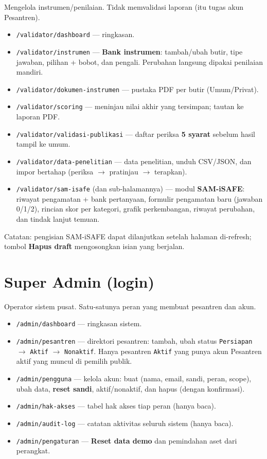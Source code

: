 \documentclass[11pt,a4paper]{article}
\newcommand{\code}[1]{\texttt{#1}}
\begin{document}
Mengelola instrumen/penilaian. Tidak memvalidasi laporan (itu tugas akun Pesantren).
\begin{itemize}
  \item \code{/validator/dashboard} --- ringkasan.
  \item \code{/validator/instrumen} --- \textbf{Bank instrumen}: tambah/ubah butir,
        tipe jawaban, pilihan + bobot, dan pengali. Perubahan langsung dipakai
        penilaian mandiri.
  \item \code{/validator/dokumen-instrumen} --- pustaka PDF per butir (Umum/Privat).
  \item \code{/validator/scoring} --- meninjau nilai akhir yang tersimpan; tautan
        ke laporan PDF.
  \item \code{/validator/validasi-publikasi} --- daftar periksa \textbf{5 syarat}
        sebelum hasil tampil ke umum.
  \item \code{/validator/data-penelitian} --- data penelitian, unduh CSV/JSON, dan
        impor bertahap (periksa $\rightarrow$ pratinjau $\rightarrow$ terapkan).
  \item \code{/validator/sam-isafe} (dan sub-halamannya) --- modul \textbf{SAM-iSAFE}:
        riwayat pengamatan + bank pertanyaan, formulir pengamatan baru (jawaban
        0/1/2), rincian skor per kategori, grafik perkembangan, riwayat perubahan,
        dan tindak lanjut temuan.
\end{itemize}

\noindent Catatan: pengisian SAM-iSAFE dapat dilanjutkan setelah halaman
di-refresh; tombol \textbf{Hapus draft} mengosongkan isian yang berjalan.

\section{Super Admin (login)}

Operator sistem pusat. Satu-satunya peran yang membuat pesantren dan akun.
\begin{itemize}
  \item \code{/admin/dashboard} --- ringkasan sistem.
  \item \code{/admin/pesantren} --- direktori pesantren: tambah, ubah status
        \code{Persiapan} $\rightarrow$ \code{Aktif} $\rightarrow$ \code{Nonaktif}.
        Hanya pesantren \code{Aktif} yang punya akun Pesantren aktif yang muncul di
        pemilih publik.
  \item \code{/admin/pengguna} --- kelola akun: buat (nama, email, sandi, peran,
        scope), ubah data, \textbf{reset sandi}, aktif/nonaktif, dan hapus (dengan
        konfirmasi).
  \item \code{/admin/hak-akses} --- tabel hak akses tiap peran (hanya baca).
  \item \code{/admin/audit-log} --- catatan aktivitas seluruh sistem (hanya baca).
  \item \code{/admin/pengaturan} --- \textbf{Reset data demo} dan pemindahan aset
        dari perangkat.
\end{itemize}
\end{document}
